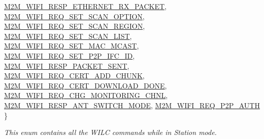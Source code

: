 \begin{DoxyCompactItemize}
\hyperlink{group__WlanEnums_gga064de09dec1d5e88ed8d075fa40f57dea2d2336ccd8bfda6e083b0ec6b8d798ba}{M2\+M\+\_\+\+W\+I\+F\+I\+\_\+\+R\+E\+S\+P\+\_\+\+E\+T\+H\+E\+R\+N\+E\+T\+\_\+\+R\+X\+\_\+\+P\+A\+C\+K\+ET}, 
\hyperlink{group__WlanEnums_gga064de09dec1d5e88ed8d075fa40f57dea95e9a50ab14cddc8421dc02928027892}{M2\+M\+\_\+\+W\+I\+F\+I\+\_\+\+R\+E\+Q\+\_\+\+S\+E\+T\+\_\+\+S\+C\+A\+N\+\_\+\+O\+P\+T\+I\+ON}, 
\hyperlink{group__WlanEnums_gga064de09dec1d5e88ed8d075fa40f57deab10eb46bba8f7314383ad0e642faa4ce}{M2\+M\+\_\+\+W\+I\+F\+I\+\_\+\+R\+E\+Q\+\_\+\+S\+E\+T\+\_\+\+S\+C\+A\+N\+\_\+\+R\+E\+G\+I\+ON}, 
\newline
\hyperlink{group__WlanEnums_gga064de09dec1d5e88ed8d075fa40f57dea1ac22ce0ce7d422cc7afbc08c7a8e61a}{M2\+M\+\_\+\+W\+I\+F\+I\+\_\+\+R\+E\+Q\+\_\+\+S\+E\+T\+\_\+\+S\+C\+A\+N\+\_\+\+L\+I\+ST}, 
\hyperlink{group__WlanEnums_gga064de09dec1d5e88ed8d075fa40f57dea8aeeaa077fcf188cd86d1d8fc1e620c7}{M2\+M\+\_\+\+W\+I\+F\+I\+\_\+\+R\+E\+Q\+\_\+\+S\+E\+T\+\_\+\+M\+A\+C\+\_\+\+M\+C\+A\+ST}, 
\hyperlink{group__WlanEnums_gga064de09dec1d5e88ed8d075fa40f57deaad2bf68ea7f19370a26774b55f8b7f8e}{M2\+M\+\_\+\+W\+I\+F\+I\+\_\+\+R\+E\+Q\+\_\+\+S\+E\+T\+\_\+\+P2\+P\+\_\+\+I\+F\+C\+\_\+\+ID}, 
\hyperlink{group__WlanEnums_gga064de09dec1d5e88ed8d075fa40f57dea6b3c32fea678ae3b3d764238a476c6c4}{M2\+M\+\_\+\+W\+I\+F\+I\+\_\+\+R\+E\+S\+P\+\_\+\+P\+A\+C\+K\+E\+T\+\_\+\+S\+E\+NT}, 
\newline
\hyperlink{group__WlanEnums_gga064de09dec1d5e88ed8d075fa40f57dea63056a3e91825d039af1c4ad3f5568c8}{M2\+M\+\_\+\+W\+I\+F\+I\+\_\+\+R\+E\+Q\+\_\+\+C\+E\+R\+T\+\_\+\+A\+D\+D\+\_\+\+C\+H\+U\+NK}, 
\hyperlink{group__WlanEnums_gga064de09dec1d5e88ed8d075fa40f57deae1929d9b34ff99c5064603820bd46012}{M2\+M\+\_\+\+W\+I\+F\+I\+\_\+\+R\+E\+Q\+\_\+\+C\+E\+R\+T\+\_\+\+D\+O\+W\+N\+L\+O\+A\+D\+\_\+\+D\+O\+NE}, 
\hyperlink{group__WlanEnums_gga064de09dec1d5e88ed8d075fa40f57dea6ec4ad7e22372a7ae59eb2a72523211e}{M2\+M\+\_\+\+W\+I\+F\+I\+\_\+\+R\+E\+Q\+\_\+\+C\+H\+G\+\_\+\+M\+O\+N\+I\+T\+O\+R\+I\+N\+G\+\_\+\+C\+H\+NL}, 
\hyperlink{group__WlanEnums_gga064de09dec1d5e88ed8d075fa40f57dea7cb9607c86c342c2b97d49254fa2433d}{M2\+M\+\_\+\+W\+I\+F\+I\+\_\+\+R\+E\+S\+P\+\_\+\+A\+N\+T\+\_\+\+S\+W\+I\+T\+C\+H\+\_\+\+M\+O\+DE}, 
\newline
\hyperlink{group__WlanEnums_gga064de09dec1d5e88ed8d075fa40f57dea4e202c60cd4154e5c0c247e0fa8c990f}{M2\+M\+\_\+\+W\+I\+F\+I\+\_\+\+R\+E\+Q\+\_\+\+P2\+P\+\_\+\+A\+U\+TH}
 \}\begin{DoxyCompactList}\small\item\em This enum contains all the W\+I\+LC commands while in Station mode. \end{DoxyCompactList}

\end{DoxyCompactItemize}
